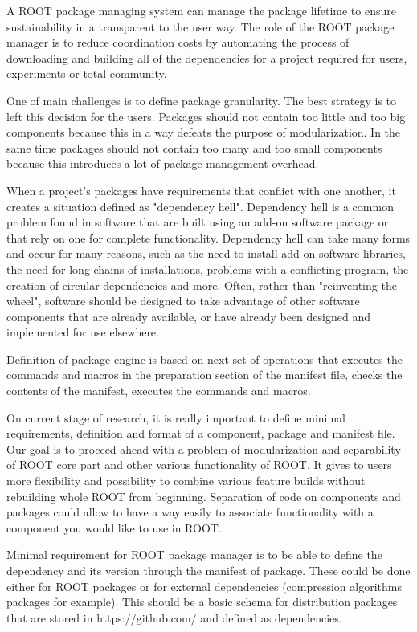 \documentclass{webofc}
\begin{document}
A ROOT package managing system can manage the package lifetime to ensure sustainability in a transparent to the user way. The role of the ROOT package manager is to reduce coordination costs by automating the process of downloading and building all of the dependencies for a project required for users, experiments or total community.

One of main challenges is to define package granularity. The best strategy is to left this decision for the users. Packages should not contain too little and too big components because this in a way defeats the purpose of modularization. In the same time packages should not contain too many and too small components because this introduces a lot of package management overhead.

When a project's packages have requirements that conflict with one another, it creates a situation defined as "dependency hell". Dependency hell is a common problem found in software that are built using an add-on software package or that rely on one for complete functionality. Dependency hell can take many forms and occur for many reasons, such as the need to install add-on software libraries, the need for long chains of installations, problems with a conflicting program, the creation of circular dependencies and more.
Often, rather than "reinventing the wheel", software should be designed to take advantage of other software components that are already available, or have already been designed and implemented for use elsewhere.

Definition of package engine is based on next set of operations that executes the commands and macros in the preparation section of the manifest file, checks the contents of the manifest, executes the commands and macros.

On current stage of research, it is really important  to define minimal requirements, definition and format of a component, package and manifest file. Our goal is to proceed ahead with a problem of modularization and separability of ROOT core part and other various functionality of ROOT. It gives to users more flexibility and possibility to combine various feature builds without rebuilding whole ROOT from beginning. Separation of code on components and packages could allow to have a way easily to associate functionality with a component you would like to use in ROOT.

Minimal requirement for ROOT package manager is to be able to define the dependency and its version through the manifest of package. These could be done either for ROOT packages or for external dependencies (compression algorithms packages for example). This should be a basic schema for distribution packages that are stored in  https://github.com/ and defined as dependencies.
\end{document}
